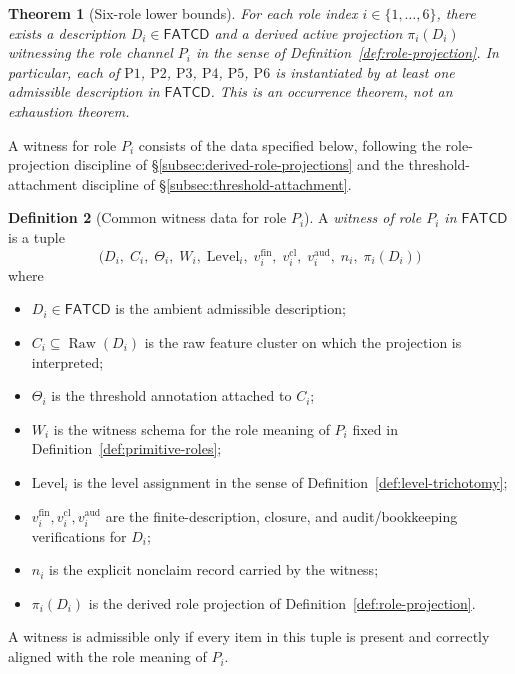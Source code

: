 \documentclass[11pt]{article}
\newtheorem{theorem}{Theorem}[section]
\theoremstyle{definition}
\newtheorem{definition}[theorem]{Definition}
\newcommand{\FATCD}{\ensuremath{\mathsf{FATCD}}}
\newcommand{\Raw}[1]{\ensuremath{\operatorname{Raw}\!\left(#1\right)}}
\newcommand{\Pone}{\ensuremath{\mathrm{P1}}}
\newcommand{\Ptwo}{\ensuremath{\mathrm{P2}}}
\newcommand{\Pthree}{\ensuremath{\mathrm{P3}}}
\newcommand{\Pfour}{\ensuremath{\mathrm{P4}}}
\newcommand{\Pfive}{\ensuremath{\mathrm{P5}}}
\newcommand{\Psix}{\ensuremath{\mathrm{P6}}}
\begin{document}
\begin{theorem}[Six-role lower bounds]\label{thm:six-role-lower-bounds}
For each role index \(i \in \{1,\ldots,6\}\), there exists a description
\(D_i \in \FATCD{}\) and a derived active projection
\(\pi_i(D_i)\) witnessing the role channel \(P_i\) in the sense of
Definition~\ref{def:role-projection}. In particular, each of
\Pone{}, \Ptwo{}, \Pthree{}, \Pfour{}, \Pfive{}, \Psix{} is instantiated
by at least one admissible description in \FATCD{}. This is an occurrence
theorem, not an exhaustion theorem.
\end{theorem}

A witness for role \(P_i\) consists of the data specified below,
following the role-projection discipline of
\S\ref{subsec:derived-role-projections} and the threshold-attachment
discipline of \S\ref{subsec:threshold-attachment}.

\begin{definition}[Common witness data for role \(P_i\)]\label{def:common-witness-data}
A \emph{witness of role \(P_i\) in \FATCD{}} is a tuple
\[
\bigl(D_i,\; C_i,\; \Theta_i,\; W_i,\; \mathrm{Level}_i,\;
v_i^{\mathrm{fin}},\; v_i^{\mathrm{cl}},\; v_i^{\mathrm{aud}},\;
n_i,\; \pi_i(D_i)\bigr)
\]
where
\begin{itemize}[topsep=2pt,itemsep=1pt]
  \item \(D_i \in \FATCD{}\) is the ambient admissible description;
  \item \(C_i \subseteq \Raw{D_i}\) is the raw feature cluster on which
    the projection is interpreted;
  \item \(\Theta_i\) is the threshold annotation attached to \(C_i\);
  \item \(W_i\) is the witness schema for the role meaning of \(P_i\)
    fixed in Definition~\ref{def:primitive-roles};
  \item \(\mathrm{Level}_i\) is the level assignment in the sense of
    Definition~\ref{def:level-trichotomy};
  \item \(v_i^{\mathrm{fin}}, v_i^{\mathrm{cl}}, v_i^{\mathrm{aud}}\) are
    the finite-description, closure, and audit/bookkeeping verifications
    for \(D_i\);
  \item \(n_i\) is the explicit nonclaim record carried by the witness;
  \item \(\pi_i(D_i)\) is the derived role projection of
    Definition~\ref{def:role-projection}.
\end{itemize}
A witness is admissible only if every item in this tuple is present and
correctly aligned with the role meaning of \(P_i\).
\end{definition}
\end{document}
